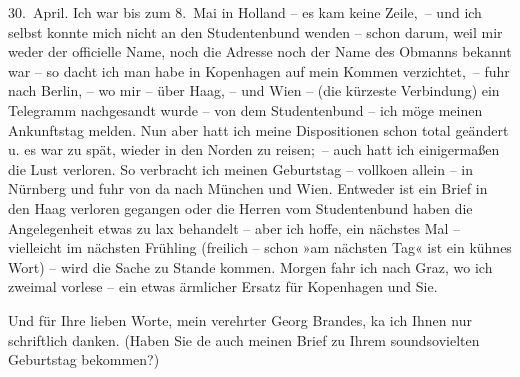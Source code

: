                   30. April. Ich war bis zum 8. Mai in Holland – es kam keine Zeile, – und ich selbst konnte mich nicht
               an den Studentenbund wenden – schon darum, weil mir weder der officielle Name, noch
               die Adresse noch der Name des Obmanns {\pb}bekannt war
               – so dacht ich man habe in Kopenhagen auf mein
               Kommen verzichtet, – fuhr nach Berlin, – wo mir –
               über Haag, – und Wien – (die kürzeste Verbindung) ein Telegramm nachgesandt wurde – von dem
               Studentenbund – ich möge meinen Ankunftstag melden. Nun aber hatt ich meine
               Dispositionen schon total geändert u. es war zu spät, wieder in den Norden zu
               reisen; – auch hatt ich einigermaßen die Lust verloren. So verbracht ich meinen
               Geburtstag – vollko{\geminationm}en allein – in Nürnberg und fuhr von da nach München und Wien. Entweder ist ein Brief
               in den Haag verloren gegangen oder die Herren
               vom Studentenbund haben die Angelegenheit etwas zu lax behandelt – aber ich hoffe,
               ein nächstes Mal – vielleicht im nächsten Frühling (freilich – schon »am nächsten
               Tag« ist ein kühnes Wort) – wird die Sache zu Stande kommen. {\pb}Morgen fahr ich nach Graz, wo ich zweimal vorlese – ein etwas ärmlicher Ersatz für
                  Kopenhagen und Sie.\pend
           
\pstart
           Und für Ihre lieben Worte, mein verehrter Georg Brandes, ka{\geminationn} ich Ihnen nur schriftlich danken. (Haben Sie de{\geminationn} auch meinen Brief zu Ihrem soundsovielten Geburtstag
               bekommen?)\pend
           
